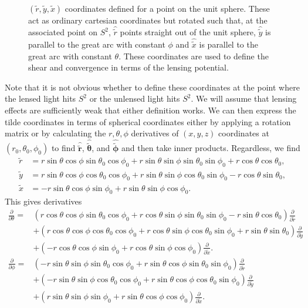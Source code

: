 \documentclass[11pt]{article} %
\begin{document}
\begin{figure}[h!]
    \centering
    
    \caption{
        $(\tilde r, \tilde y, \tilde x)$ coordinates defined for a point on the unit sphere. These act as ordinary cartesian coordinates but rotated such that, at the associated point on $S^2$, $\hat{\tilde r}$ points straight out of the unit sphere, $\hat{\tilde y}$ is parallel to the great arc with constant $\phi$ and $\hat{\tilde x}$ is parallel to the great arc with constant $\theta$. These coordinates are used to define the shear and convergence in terms of the lensing potential.
        }
    \label{fig:tildecoords}
\end{figure}

Note that it is not obvious whether to define these coordinates at the point where the lensed light hits $S^2$ or the unlensed light hits $S^2$. We will assume that lensing effects are sufficiently weak that either definition works. We can then express the tilde coordinates in terms of spherical coordinates either by applying a rotation matrix or by calculating the $r, \theta, \phi$ derivatives of $(x,y,z)$ coordinates at $(r_0, \theta_0, \phi_0)$ to find $\hat{\tilde{\mathbf r}}$, $\hat{\tilde{\boldsymbol{\theta}}}$, and $\hat{\tilde{\boldsymbol{\phi}}}$ and then take inner products. Regardless, we find
\begin{align}
    \tilde r &= r\sin\theta\cos\phi\sin\theta_0\cos\phi_0+r\sin\theta\sin\phi\sin\theta_0\sin\phi_0+r\cos\theta\cos\theta_0,\\
    \tilde y &= r\sin\theta\cos\phi\cos\theta_0\cos\phi_0+r\sin\theta\sin\phi\cos\theta_0\sin\phi_0-r\cos\theta\sin\theta_0,\\
    \tilde x &= -r\sin\theta\cos\phi\sin\phi_0+r\sin\theta\sin\phi\cos\phi_0.
\end{align}
This gives derivatives
\begin{align*}
    \frac{\partial}{\partial \theta} = & \left( r \cos \theta \cos \phi \sin \theta_0 \cos \phi_0 + r \cos \theta \sin \phi \sin \theta_0 \sin \phi_0 - r \sin \theta \cos \theta_0 \right) \frac{\partial}{\partial \tilde{r}} \\
    & + \left( r \cos \theta \cos \phi \cos \theta_0 \cos \phi_0 + r \cos \theta \sin \phi \cos \theta_0 \sin \phi_0 + r \sin \theta \sin \theta_0 \right) \frac{\partial}{\partial \tilde{y}} \\
    & + \left( -r \cos \theta \cos \phi \sin \phi_0 + r \cos \theta \sin \phi \cos \phi_0 \right) \frac{\partial}{\partial \tilde{x}}.\\
    \frac{\partial}{\partial \phi} = & \left( -r \sin \theta \sin \phi \sin \theta_0 \cos \phi_0 + r \sin \theta \cos \phi \sin \theta_0 \sin \phi_0 \right) \frac{\partial}{\partial \tilde{r}} \\
& + \left( -r \sin \theta \sin \phi \cos \theta_0 \cos \phi_0 + r \sin \theta \cos \phi \cos \theta_0 \sin \phi_0 \right) \frac{\partial}{\partial \tilde{y}} \\
& + \left( r \sin \theta \sin \phi \sin \phi_0 + r \sin \theta \cos \phi \cos \phi_0 \right) \frac{\partial}{\partial \tilde{x}}.
\end{align*}
\end{document}
